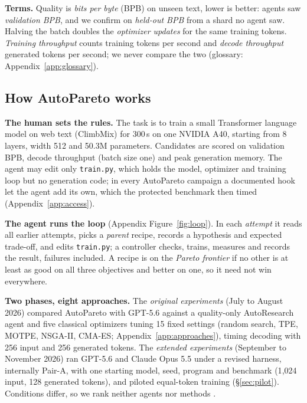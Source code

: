 \documentclass{article}
\begin{document}
 \textbf{Terms.} Quality is \emph{bits per byte} (BPB) on unseen text, lower is better: agents saw \emph{validation BPB}, and we confirm on \emph{held-out BPB} from a shard no agent saw. Halving the batch doubles the \emph{optimizer updates} for the same training tokens. \emph{Training throughput} counts training tokens per second and \emph{decode throughput} generated tokens per second; we never compare the two (glossary: Appendix~\ref{app:glossary}).

\subsection{How AutoPareto works}\label{sec:brief}
 \textbf{The human sets the rules.} The task is to train a small Transformer language model on web text (ClimbMix) for 300\,s on one NVIDIA A40, starting from 8 layers, width 512 and 50.3M parameters. Candidates are scored on validation BPB, decode throughput (batch size one) and peak generation memory. The agent may edit only \texttt{train.py}, which holds the model, optimizer and training loop but no generation code; in every AutoPareto campaign a documented hook let the agent add its own, which the protected benchmark then timed (Appendix~\ref{app:access}).

 \textbf{The agent runs the loop} (Appendix Figure~\ref{fig:loop}). In each \emph{attempt} it reads all earlier attempts, picks a \emph{parent} recipe, records a hypothesis and expected trade-off, and edits \texttt{train.py}; a controller checks, trains, measures and records the result, failures included. A recipe is on the \emph{Pareto frontier} if no other is at least as good on all three objectives and better on one, so it need not win everywhere.

 \textbf{Two phases, eight approaches.} The \emph{original experiments} (July to August 2026) compared AutoPareto with GPT-5.6 against a quality-only AutoResearch agent and five classical optimizers tuning 15 fixed settings (random search, TPE, MOTPE, NSGA-II, CMA-ES; Appendix~\ref{app:approaches}), timing decoding with 256 input and 256 generated tokens. The \emph{extended experiments} (September to November 2026) ran GPT-5.6 and Claude Opus 5.5 under a revised harness, internally Pair-A, with one starting model, seed, program and benchmark (1{,}024 input, 128 generated tokens), and piloted equal-token training (\S\ref{sec:pilot}). Conditions differ, so we rank neither agents nor methods \citep[cf.][]{ferreira}.
\end{document}
